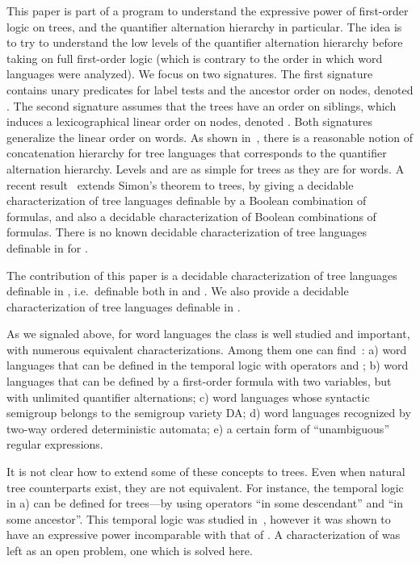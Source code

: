\documentclass{LMCS}
\begin{document}
This paper is part of a program to understand the expressive power of
first-order logic on trees, and the quantifier alternation hierarchy
in particular. The idea is to try to understand the low levels of the
quantifier alternation hierarchy before taking on full first-order
logic (which is contrary to the order in which word languages were
analyzed). We focus on two signatures. The first signature contains
unary predicates for label tests and the ancestor order on nodes,
denoted . The second signature assumes that the trees have an order
on siblings, which induces a lexicographical linear order on nodes,
denoted .  Both signatures generalize the linear order on words.
As shown in~\cite{forestexp}, there is a reasonable notion of
concatenation hierarchy for tree languages that corresponds to the
quantifier alternation hierarchy. Levels  and 
are as simple for trees as they are for words. A recent
result~\cite{simontrees} extends Simon's theorem to trees, by giving a
decidable characterization of tree languages definable by a Boolean
combination of  formulas, and also a decidable
characterization of Boolean combinations of 
formulas.  There is no known decidable characterization of tree
languages definable in  for .

The contribution of this paper is a decidable characterization of tree
languages definable in \Dtwo, i.e.~definable both in \Stwo
and .  We also provide a decidable characterization of tree
languages definable in \Dtwol.


As we signaled above, for word languages the class
 is well studied and important, with numerous equivalent
characterizations.  Among them one can
find~\cite{weilpinpoly,therienwilkefo2,turtle,EVW02}: a) word
languages that can be defined in the temporal logic with operators
 and ; b) word languages that can be defined by a
first-order formula with two variables, but with unlimited quantifier
alternations; c) word languages whose syntactic semigroup belongs to
the semigroup variety DA; d) word languages recognized by two-way
ordered deterministic automata; e) a certain form of ``unambiguous''
regular expressions.

It is not clear how to extend some of these concepts to trees. Even when
natural tree counterparts exist, they are not equivalent. For instance, the
temporal logic in a) can be defined for trees---by using operators ``in some
descendant'' and ``in some ancestor''.  This temporal logic was studied
in~\cite{fo2tree}, however it was shown to have an expressive power
incomparable with that of \Dtwo. A characterization of \Dtwo was left
as an open problem, one which is solved here.
\end{document}

